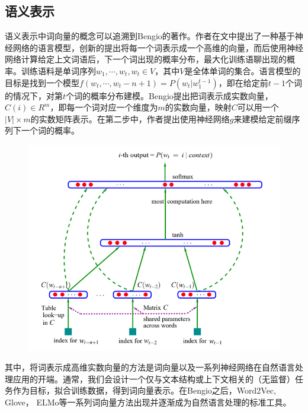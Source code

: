 \subsection{语义表示}
语义表示中词向量的概念可以追溯到Bengio的著作\cite{ bengio2003neural}。作者在文中提出了一种基于神经网络的语言模型，创新的提出将每一个词表示成一个高维的向量，而后使用神经网络计算给定上文词语后，下一个词出现的概率分布，最大化训练语聊出现的概率。训练语料是单词序列$w_1, \cdots, w_t, w_t \in V$，其中$V$是全体单词的集合。语言模型的目标是找到一个模型$f(w_t, \cdots, w_t-n+1) = P(w_t|w_1 ^ {t-1})$，即在给定前$t-1$个词的情况下，对第$t$个词的概率分布建模。Bengio提出把词表示成实数向量，$C(i) \in R^m$，即每一个词对应一个维度为$m$的实数向量，映射$C$可以用一个$|V| \times m$的实数矩阵表示。在第二步中，作者提出使用神经网络$g$来建模给定前缀序列下一个词的概率。
\begin{figure}[h!]
\centering
\includegraphics[scale=1]{img/chapter_nlp/guang_represent_1.png}
\label{fig:universe}
\end{figure}
其中，将词表示成高维实数向量的方法是词向量以及一系列神经网络在自然语言处理应用的开端。通常，我们会设计一个仅与文本结构或上下文相关的（无监督）任务作为目标，拟合训练数据，得到词向量表示。在Bengio之后，Word2Vec\cite{ mikolov2013distributed}, Glove\cite{ pennington2014glove}， ELMo\cite{ peters2018deep}等一系列词向量方法出现并逐渐成为自然语言处理的标准工具。

